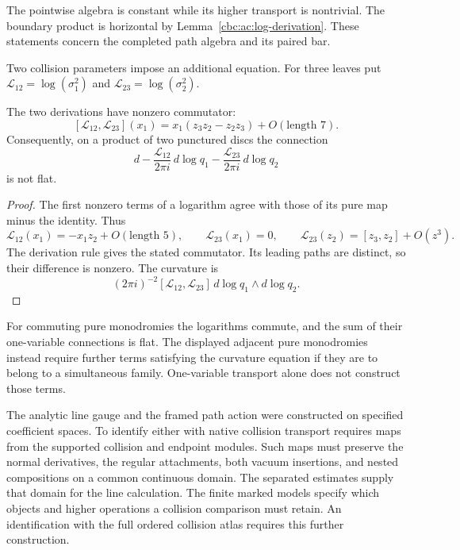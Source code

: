 The pointwise algebra is constant while
its higher transport is nontrivial.
The boundary product is horizontal by
Lemma~\ref{cbc:ac:log-derivation}.
These statements concern the completed
path algebra and its paired bar.

Two collision parameters impose an
additional equation. For three leaves
put $\mathcal L_{12}=\log(\sigma_1^2)$
and $\mathcal L_{23}=\log(\sigma_2^2)$.

\begin{proposition}\label{cbc:ac:log-curvature}
The two derivations have nonzero commutator:
\[
 [\mathcal L_{12},\mathcal L_{23}](x_1)
    =x_1(z_3z_2-z_2z_3)+O(\text{length }7).
\]
Consequently, on a product of two punctured
discs the connection
\[
 d-\frac{\mathcal L_{12}}{2\pi i}\,d\log q_1
   -\frac{\mathcal L_{23}}{2\pi i}\,d\log q_2
\]
is not flat.
\end{proposition}
\begin{proof}
The first nonzero terms of a logarithm
agree with those of its pure map minus
the identity. Thus
\[
 \mathcal L_{12}(x_1)=-x_1z_2+O(\text{length }5),
 \qquad \mathcal L_{23}(x_1)=0,\qquad
 \mathcal L_{23}(z_2)=[z_3,z_2]+O(z^3).
\]
The derivation rule gives the stated
commutator. Its leading paths are
distinct, so their difference is nonzero.
The curvature is
\[
 (2\pi i)^{-2}[\mathcal L_{12},\mathcal L_{23}]
                   \,d\log q_1\wedge d\log q_2.
\]
\end{proof}

For commuting pure monodromies the logarithms
commute, and the sum of their one-variable
connections is flat. The displayed adjacent
pure monodromies instead require further
terms satisfying the curvature equation
if they are to belong to a simultaneous
family. One-variable transport alone
does not construct those terms.

The analytic line gauge and the framed
path action were constructed on specified
coefficient spaces. To identify either
with native collision transport requires
maps from the supported collision and
endpoint modules. Such maps must preserve
the normal derivatives, the regular
attachments, both vacuum insertions, and
nested compositions on a common continuous
domain. The separated estimates supply
that domain for the line calculation.
The finite marked models specify which
objects and higher operations a collision
comparison must retain. An identification
with the full ordered collision atlas
requires this further construction.
